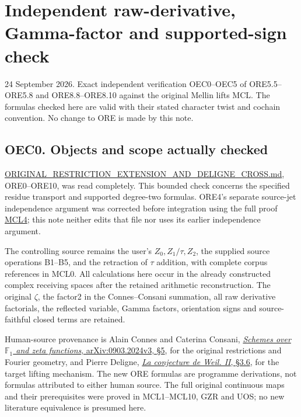 \section{Independent raw-derivative, Gamma-factor and supported-sign
check}\label{independent-raw-derivative-gamma-factor-and-supported-sign-check}

24 September 2026. Exact independent verification OEC0--OEC5 of
ORE5.5--ORE5.8 and ORE8.8--ORE8.10 against the original Mellin lifts
MCL. The formulas checked here are valid with their stated character
twist and cochain convention. No change to ORE is made by this note.

\subsection{OEC0. Objects and scope actually
checked}\label{oec0.-objects-and-scope-actually-checked}

\url{ORIGINAL_RESTRICTION_EXTENSION_AND_DELIGNE_CROSS.md}, ORE0--ORE10,
was read completely. This bounded check concerns the specified residue
transport and supported degree-two formulas. ORE4's separate source-jet
independence argument was corrected before integration using the full
proof \href{ORIGINAL_MELLIN_CHARACTER_LIFTING.md}{MCL4}; this note
neither edits that file nor uses its earlier independence argument.

The controlling source remains the user's \(Z_0,Z_1/\tau,Z_2\), the
supplied source operations B1--B5, and the retraction of \(\tau\)
addition, with complete corpus references in MCL0. All calculations here
occur in the already constructed complex receiving spaces after the
retained arithmetic reconstruction. The original \(\zeta\), the factor2
in the Connes--Consani summation, all raw derivative factorials, the
reflected variable, Gamma factors, orientation signs and source-faithful
closed terms are retained.

Human-source provenance is Alain Connes and Caterina Consani,
\href{https://arxiv.org/abs/0903.2024v3}{\emph{Schemes over
\(\mathbb F_1\) and zeta functions}, arXiv:0903.2024v3, §5}, for the
original restrictions and Fourier geometry, and Pierre Deligne,
\href{https://www.numdam.org/item/PMIHES_1980__52__137_0/}{\emph{La
conjecture de Weil. II}, §3.6}, for the target lifting mechanism. The
new ORE formulas are programme derivations, not formulas attributed to
either human source. The full original continuous maps and their
prerequisites were proved in MCL1--MCL10, GZR and UOS; no new literature
equivalence is presumed here.

